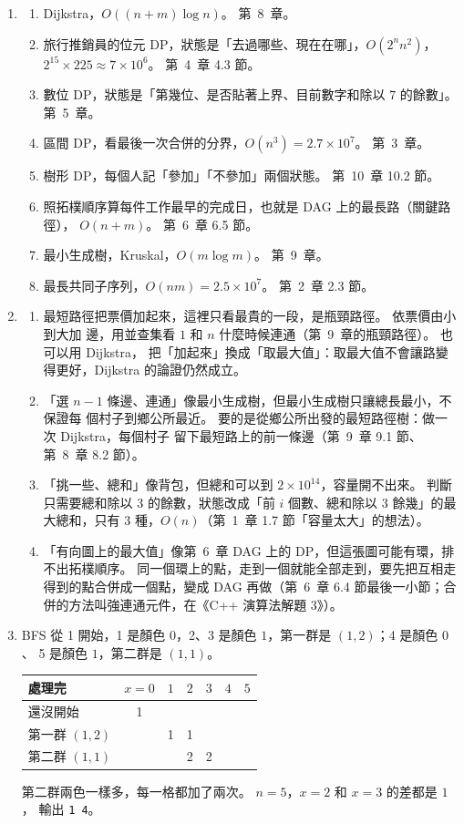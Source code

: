 \begin{enumerate}
\item
\begin{enumerate}
\item Dijkstra，$O((n + m) \log n)$。 第~8~章。
\item 旅行推銷員的位元 DP，狀態是「去過哪些、現在在哪」，$O(2^n n^2)$，
$2^{15} \times 225 \approx 7 \times 10^6$。 第~4~章 4.3 節。
\item 數位 DP，狀態是「第幾位、是否貼著上界、目前數字和除以 $7$ 的餘數」。 第~5~章。
\item 區間 DP，看最後一次合併的分界，$O(n^3) = 2.7 \times 10^7$。 第~3~章。
\item 樹形 DP，每個人記「參加」「不參加」兩個狀態。 第~10~章 10.2 節。
\item 照拓樸順序算每件工作最早的完成日，也就是 DAG 上的最長路（關鍵路徑），
$O(n + m)$。 第~6~章 6.5 節。
\item 最小生成樹，Kruskal，$O(m \log m)$。 第~9~章。
\item 最長共同子序列，$O(nm) = 2.5 \times 10^7$。 第~2~章 2.3 節。
\end{enumerate}

\item
\begin{enumerate}
\item 最短路徑把票價加起來，這裡只看最貴的一段，是瓶頸路徑。 依票價由小到大加
邊，用並查集看 $1$ 和 $n$ 什麼時候連通（第~9~章的瓶頸路徑）。 也可以用 Dijkstra，
把「加起來」換成「取最大值」：取最大值不會讓路變得更好，Dijkstra 的論證仍然成立。
\item 「選 $n - 1$ 條邊、連通」像最小生成樹，但最小生成樹只讓總長最小，不保證每
個村子到鄉公所最近。 要的是從鄉公所出發的最短路徑樹：做一次 Dijkstra，每個村子
留下最短路上的前一條邊（第~9~章 9.1 節、第~8~章 8.2 節）。
\item 「挑一些、總和」像背包，但總和可以到 $2 \times 10^{14}$，容量開不出來。 判斷只需要總和除以 $3$ 的餘數，狀態改成「前 $i$ 個數、總和除以 $3$
餘幾」的最大總和，只有 $3$ 種，$O(n)$（第~1~章 1.7 節「容量太大」的想法）。
\item 「有向圖上的最大值」像第~6~章 DAG 上的 DP，但這張圖可能有環，排不出拓樸順序。
同一個環上的點，走到一個就能全部走到，要先把互相走得到的點合併成一個點，變成 DAG
再做（第~6~章 6.4 節最後一小節；合併的方法叫強連通元件，在《C++ 演算法解題 3》）。
\end{enumerate}

\item BFS 從 1 開始，1 是顏色 $0$，2、3 是顏色 $1$，第一群是 $(1, 2)$；4 是顏色 $0$、
5 是顏色 $1$，第二群是 $(1, 1)$。
\begin{center}
\begin{tabular}{lcccccc}
\toprule
處理完 & $x = 0$ & $1$ & $2$ & $3$ & $4$ & $5$ \\
\midrule
還沒開始 & 1 & & & & & \\
第一群 $(1, 2)$ & & 1 & 1 & & & \\
第二群 $(1, 1)$ & & & 2 & 2 & & \\
\bottomrule
\end{tabular}
\end{center}
第二群兩色一樣多，每一格都加了兩次。 $n = 5$，$x = 2$ 和 $x = 3$ 的差都是 $1$，
輸出 \texttt{1 4}。


\end{enumerate}

